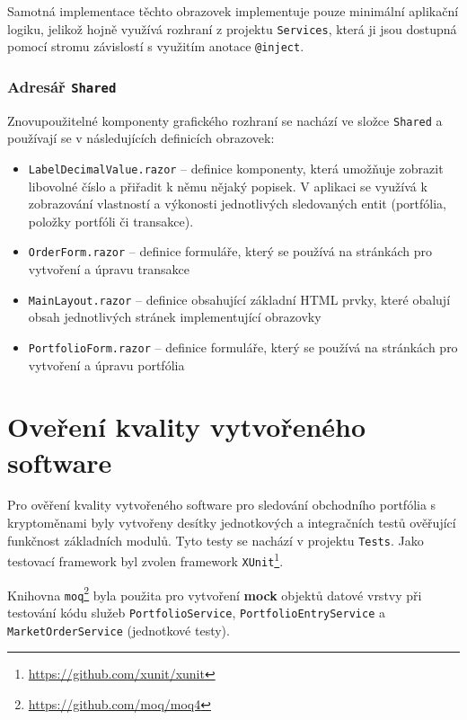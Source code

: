 \documentclass[12pt, a4paper]{article}
\begin{document}
    Samotná implementace těchto obrazovek implementuje pouze minimální aplikační logiku, jelikož hojně využívá rozhraní z projektu
    \texttt{Services}, která ji jsou dostupná pomocí stromu závislostí s využitím anotace \texttt{@inject}.

    \subsubsection{Adresář \texttt{Shared}}
    Znovupoužitelné komponenty grafického rozhraní se nachází ve složce \texttt{Shared} a používají se v následujících definicích obrazovek:

    \begin{itemize}
        \item \texttt{LabelDecimalValue.razor} -- definice komponenty, která umožňuje zobrazit libovolné číslo a přiřadit
        k němu nějaký popisek. V aplikaci se využívá k zobrazování vlastností a výkonosti jednotlivých sledovaných entit
        (portfólia, položky portfóli či transakce).
        \item \texttt{OrderForm.razor} -- definice formuláře, který se používá na stránkách pro vytvoření a úpravu transakce
        \item \texttt{MainLayout.razor} -- definice obsahující základní HTML prvky, které obalují obsah jednotlivých stránek implementující obrazovky
        \item \texttt{PortfolioForm.razor} -- definice formuláře, který se používá na stránkách pro vytvoření a úpravu portfólia
    \end{itemize}

    \section{Oveření kvality vytvořeného software}

    Pro ověření kvality vytvořeného software pro sledování obchodního portfólia s kryptoměnami byly vytvořeny desítky jednotkových a integračních testů ověřující funkčnost základních modulů. Tyto testy se nachází v projektu \texttt{Tests}. Jako testovací framework byl zvolen framework \texttt{XUnit}\footnote{\url{https://github.com/xunit/xunit}}.

    Knihovna \texttt{moq}\footnote{\url{https://github.com/moq/moq4}} byla použita pro vytvoření \textbf{mock} objektů datové vrstvy při testování kódu služeb \texttt{PortfolioService}, \texttt{PortfolioEntryService} a \texttt{MarketOrderService} (jednotkové testy).
\end{document}
